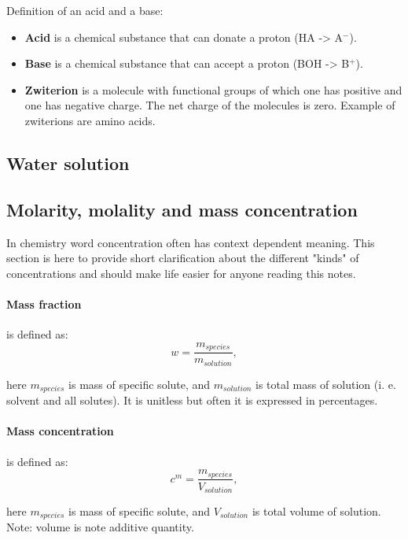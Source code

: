 Definition of an acid and a base:
\begin{itemize}
    \item \textbf{Acid} is a chemical substance that can donate a proton (HA -> A$^-$).
    \item \textbf{Base} is a chemical substance that can accept a proton (BOH -> B$^+$).
    \item \textbf{Zwiterion} is a molecule with functional groups of which one has positive and one has negative charge. The net charge of the molecules is zero. Example of zwiterions are amino acids.
\end{itemize}


\subsection{Water solution}

\subsection{Molarity, molality and mass concentration}

In chemistry word concentration often has context dependent meaning. This section is here to provide short clarification about the different "kinds" of concentrations and should make life easier for anyone reading this notes.

\paragraph*{Mass fraction}
is defined as:
\begin{equation}\label{eq:defMassFrac}
    w = \frac{m_{species}}{m_{solution}},
\end{equation}

here $m_{species}$ is mass of specific solute, and $m_{solution}$ is total mass of solution (i. e. solvent and all solutes). It is unitless but often it is expressed in percentages.

\paragraph*{Mass concentration}
is defined as:
\begin{equation}\label{eq:defMassConc}
    c^{m} = \frac{m_{species}}{V_{solution}},
\end{equation}

here $m_{species}$ is mass of specific solute, and $V_{solution}$ is total volume of solution. Note: volume is note additive quantity.

